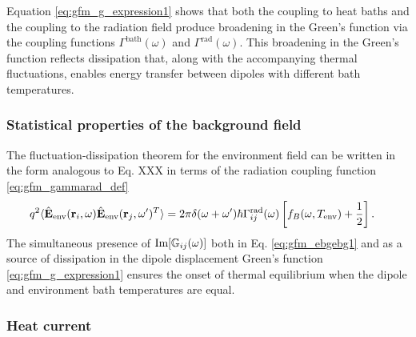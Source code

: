 Equation \eqref{eq:gfm_g_expression1} shows that both the coupling to heat baths and the coupling to the radiation field produce broadening in the Green's function via the coupling functions $\Gamma^{\textrm{bath}}(\omega)$ and $\Gamma^{\textrm{rad}}(\omega)$. This broadening in the Green's function reflects dissipation that, along with the accompanying thermal fluctuations, enables energy transfer between dipoles with different bath temperatures.

\subsubsection{Statistical properties of the background field}

The fluctuation-dissipation theorem for the environment field can be written in the form analogous to Eq. XXX in terms of the radiation coupling function \eqref{eq:gfm_gammarad_def} \cite{novotny}
\begin{alignat}{2}
  q^2 \langle \hat{\mathbf{E}}_{\textrm{env}}(\mathbf{r}_i,\omega) \hat{\mathbf{E}}_{\textrm{env}}(\mathbf{r}_j,\omega')^T \rangle   &=  2\pi \delta(\omega+\omega') \hbar \Gamma^{\textrm{rad}}_{ij}(\omega) \left[f_B(\omega,T_{\textrm{env}})+\frac{1}{2} \right]. \label{eq:gfm_ebgebg1}
\end{alignat}
The simultaneous presence of $\textrm{Im}[\mathbb{G}_{ij}(\omega)]$ both in Eq. \eqref{eq:gfm_ebgebg1} and as a source of dissipation in the dipole displacement Green's function \eqref{eq:gfm_g_expression1} ensures the onset of thermal equilibrium when the dipole and environment bath temperatures are equal. 

\subsubsection{Heat current}

